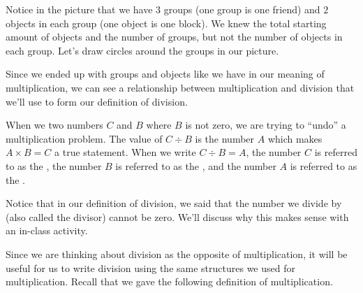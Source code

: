 \documentclass{ximera}
\begin{document}
Notice in the picture that we have $3$ groups (one group is one friend) and $2$ objects in each group (one object is one block). We knew the total starting amount of objects and the number of groups, but not the number of objects in each group. Let's draw circles around the groups in our picture.
\begin{image}
\end{image}


Since we ended up with groups and objects like we have in our meaning of multiplication, we can see a relationship between multiplication and division that we'll use to form our definition of division.

\begin{definition}
When we  two numbers $C$ and $B$ where $B$ is not zero, we are trying to ``undo'' a multiplication problem. The value of $C \div B$ is the number $A$ which makes $A \times B = C$ a true statement. When we write $C \div B = A$, the number $C$ is referred to as the , the number $B$ is referred to as the , and the number $A$ is referred to as the . 

\begin{image}
\end{image}
\end{definition}
Notice that in our definition of division, we said that the number we divide by (also called the divisor) cannot be zero. We'll discuss why this makes sense with an in-class activity.

Since we are thinking about division as the opposite of multiplication, it will be useful for us to write division using the same structures we used for multiplication. Recall that we gave the following definition of multiplication.
\end{document}
